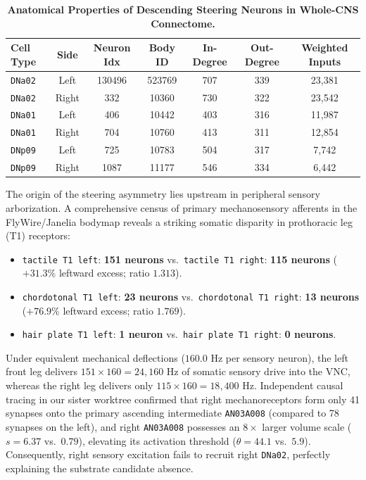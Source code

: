 \documentclass[10pt,letterpaper]{article}
\begin{document}
\begin{table}[h]
\centering
\small
\caption{\textbf{Anatomical Properties of Descending Steering Neurons in Whole-CNS Connectome.}}
\label{tab:neuroanatomy_dn}
\begin{tabular*}{\columnwidth}{@{\extracolsep{\fill}}lcccccc@{}}
\toprule
\textbf{Cell Type} & \textbf{Side} & \textbf{Neuron Idx} & \textbf{Body ID} & \textbf{In-Degree} & \textbf{Out-Degree} & \textbf{Weighted Inputs} \\
\midrule
\texttt{DNa02} & Left & 130496 & 523769 & 707 & 339 & 23,381 \\
\texttt{DNa02} & Right & 332 & 10360 & 730 & 322 & 23,542 \\
\texttt{DNa01} & Left & 406 & 10442 & 403 & 316 & 11,987 \\
\texttt{DNa01} & Right & 704 & 10760 & 413 & 311 & 12,854 \\
\texttt{DNp09} & Left & 725 & 10783 & 504 & 317 & 7,742 \\
\texttt{DNp09} & Right & 1087 & 11177 & 546 & 334 & 6,442 \\
\bottomrule
\end{tabular*}
\end{table}

The origin of the steering asymmetry lies upstream in peripheral sensory arborization. A comprehensive census of primary mechanosensory afferents in the FlyWire/Janelia bodymap reveals a striking somatic disparity in prothoracic leg (T1) receptors:
\begin{itemize}
    \item \texttt{tactile T1 left}: \textbf{151 neurons} vs.\ \texttt{tactile T1 right}: \textbf{115 neurons} ($+31.3\%$ leftward excess; ratio $1.313$).
    \item \texttt{chordotonal T1 left}: \textbf{23 neurons} vs.\ \texttt{chordotonal T1 right}: \textbf{13 neurons} ($+76.9\%$ leftward excess; ratio $1.769$).
    \item \texttt{hair plate T1 left}: \textbf{1 neuron} vs.\ \texttt{hair plate T1 right}: \textbf{0 neurons}.
\end{itemize}

Under equivalent mechanical deflections ($160.0\text{ Hz}$ per sensory neuron), the left front leg delivers $151 \times 160 = 24,160\text{ Hz}$ of somatic sensory drive into the VNC, whereas the right leg delivers only $115 \times 160 = 18,400\text{ Hz}$. Independent causal tracing in our sister worktree confirmed that right mechanoreceptors form only 41 synapses onto the primary ascending intermediate \texttt{AN03A008} (compared to 78 synapses on the left), and right \texttt{AN03A008} possesses an $8\times$ larger volume scale ($s = 6.37$ vs.\ $0.79$), elevating its activation threshold ($\theta = 44.1$ vs.\ $5.9$). Consequently, right sensory excitation fails to recruit right \texttt{DNa02}, perfectly explaining the substrate candidate absence.
\end{document}
